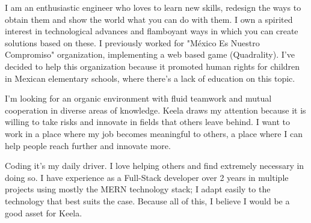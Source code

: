 \documentclass[11pt, a4paper]{awesome-cv}
\begin{document}
\makecvheader

\makelettertitle

\begin{cvletter}
I am an enthusiastic engineer who loves to learn new skills, redesign the ways to obtain them and show the world what you can do with them. I own a spirited interest in technological advances and flamboyant ways in which you can create solutions based on these. I previously worked for "México Es Nuestro Compromiso" organization, implementing a web based game (Quadrality). I've decided to help this organization because it promoted human rights for children in Mexican elementary schools, where there's a lack of education on this topic. 

I'm looking for an organic environment with fluid teamwork and mutual cooperation in diverse areas of knowledge. Keela draws my attention because it is willing to take risks and innovate in fields that others leave behind. I want to work in a place where my job becomes meaningful to others, a place where I can help people reach further and innovate more.

 Coding it's my daily driver. I love helping others and find extremely necessary in doing so. I have experience as a Full-Stack developer over 2 years in multiple projects using mostly the MERN technology stack; I adapt easily to the technology that best suits the case. Because all of this, I believe I would be a good asset for Keela.
 
\end{cvletter}

\makeletterclosing
\end{document}
